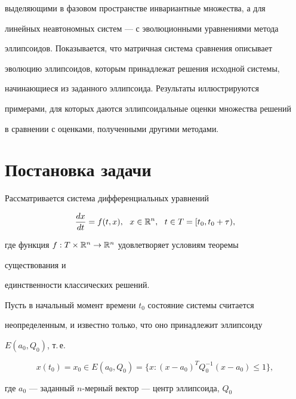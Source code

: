 выделяющими в фазовом пространстве инвариантные множества, а для 


линейных неавтономных систем --- с эволюционными уравнениями метода 


эллипсоидов. Показывается, что матричная система сравнения описывает 


эволюцию эллипсоидов, которым принадлежат решения исходной системы, 


начинающиеся из заданного эллипсоида. Результаты иллюстрируются 


примерами, для которых даются эллипсоидальные оценки множества решений 


в сравнении с оценками, полученными другими методами. 


 


\section{Постановка задачи} 


 


Рассматривается система дифференциальных уравнений 


\begin{equation} 


\frac{d x}{d t}=f(t,x),\ \ x\in \Bbb R^n, 


\ \ t\in T=[t_0,t_0+\tau), 


\end{equation} 


где функция $f:T\times \Bbb R^n\to \Bbb R^n$ удовлетворяет условиям теоремы 


существования и 


единственности классических решений. 


 


Пусть в начальный момент времени $t_0$ состояние системы считается 


неопределенным, и известно только, что оно принадлежит эллипсоиду 


$E(a_0,Q_0)$, т.\,е. 


\begin{equation} 


x(t_0)=x_0\in E(a_0,Q_0)=\{x:(x-a_0)^T Q^{-1}_0(x-a_0)\le1\}, 


\end{equation} 


где $a_0$ --- заданный $n$-мерный вектор --- центр эллипсоида, $Q_0$ 


